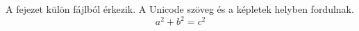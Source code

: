 A fejezet külön fájlból érkezik. A Unicode szöveg és a képletek helyben fordulnak.
\[ a^2 + b^2 = c^2 \]
